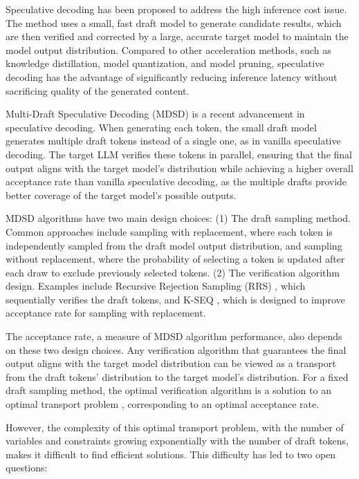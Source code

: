 \documentclass{article}
\begin{document}
Speculative decoding \citep{leviathan2023fast,chen2023accelerating} has been proposed to address the high inference cost issue. The method uses a small, fast draft model to generate candidate results, which are then verified and corrected by a large, accurate target model to maintain the model output distribution. Compared to other acceleration methods, such as knowledge distillation, model quantization, and model pruning, speculative decoding has the advantage of significantly reducing inference latency without sacrificing quality of the generated content.

Multi-Draft Speculative Decoding (MDSD) \citep{miao2024specinfer,cai2024medusa,li2024eagle,spector2023accelerating} is a recent advancement in speculative decoding. When generating each token, the small draft model generates multiple draft tokens instead of a single one, as in vanilla speculative decoding. The target LLM verifies these tokens in parallel, ensuring that the final output aligns with the target model's distribution while achieving a higher overall acceptance rate than vanilla speculative decoding, as the multiple drafts provide better coverage of the target model's possible outputs.





MDSD algorithms have two main design choices: (1) The draft sampling method. Common approaches include sampling with replacement, where each token is independently sampled from the draft model output distribution, and sampling without replacement, where the probability of selecting a token is updated after each draw to exclude previously selected tokens. (2) The verification algorithm design. Examples include Recursive Rejection Sampling (RRS) \citep{yang2024multi,jeon2024recursive}, which sequentially verifies the draft tokens, and K-SEQ \citep{sun2024spectr}, which is designed to improve acceptance rate for sampling with replacement.

The acceptance rate, a measure of MDSD algorithm performance, also depends on these two design choices. Any verification algorithm that guarantees the final output aligns with the target model distribution can be viewed as a transport from the draft tokens' distribution to the target model's distribution. For a fixed draft sampling method, the optimal verification algorithm is a solution to an optimal transport problem \citep{sun2024spectr}, corresponding to an optimal acceptance rate.




However, the complexity of this optimal transport problem, with the number of variables and constraints growing exponentially with the number of draft tokens, makes it difficult to find efficient solutions. This difficulty has led to two open questions:
\end{document}
